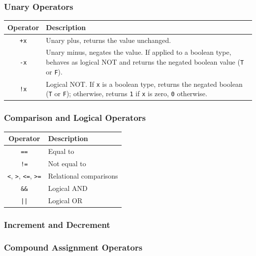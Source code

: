 \subsubsection{Unary Operators}

\begin{center}
\begin{tabular}{|c|p{11cm}|}
\hline
\textbf{Operator} & \textbf{Description} \\
\hline
\texttt{+x}  & Unary plus, returns the value unchanged. \\
\texttt{-x}  & Unary minus, negates the value. If applied to a boolean type, behaves as logical 
NOT and returns the negated boolean value (\texttt{T} or \texttt{F}). \\
\texttt{!x}  & Logical NOT. If \texttt{x} is a boolean type, returns the negated boolean (\texttt{T} 
or \texttt{F}); otherwise, returns \texttt{1} if \texttt{x} is zero, \texttt{0} otherwise. \\
\hline
\end{tabular}
\end{center}

\subsubsection{Comparison and Logical Operators}

\begin{center}
\begin{tabular}{|c|l|}
\hline
\textbf{Operator} & \textbf{Description} \\
\hline
\texttt{==}               & Equal to \\
\texttt{!=}               & Not equal to \\
\texttt{<}, \texttt{>}, \texttt{<=}, \texttt{>=} & Relational comparisons \\
\texttt{\&\&}             & Logical AND \\
\texttt{||}               & Logical OR \\
\hline
\end{tabular}
\end{center}

\newpage
\subsubsection{Increment and Decrement}



\subsubsection{Compound Assignment Operators}

